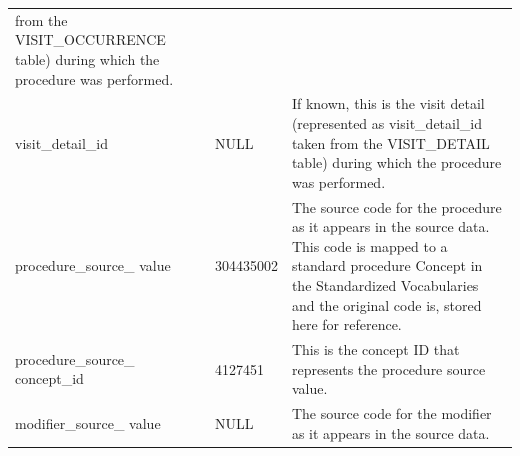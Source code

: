 \documentclass[11pt]{book}
\begin{document}
\begin{longtable}[]{@{}lll@{}}
\begin{minipage}[t]{0.48\columnwidth}
from the VISIT\_OCCURRENCE table) during which the procedure was
performed.\strut
\end{minipage}\tabularnewline
\begin{minipage}[t]{0.28\columnwidth}\raggedright\strut
visit\_detail\_id\strut
\end{minipage} & \begin{minipage}[t]{0.16\columnwidth}\raggedright\strut
NULL\strut
\end{minipage} & \begin{minipage}[t]{0.48\columnwidth}\raggedright\strut
If known, this is the visit detail (represented as visit\_detail\_id
taken from the VISIT\_DETAIL table) during which the procedure was
performed.\strut
\end{minipage}\tabularnewline
\begin{minipage}[t]{0.28\columnwidth}\raggedright\strut
procedure\_source\_ value\strut
\end{minipage} & \begin{minipage}[t]{0.16\columnwidth}\raggedright\strut
304435002\strut
\end{minipage} & \begin{minipage}[t]{0.48\columnwidth}\raggedright\strut
The source code for the procedure as it appears in the source data. This
code is mapped to a standard procedure Concept in the Standardized
Vocabularies and the original code is, stored here for reference.\strut
\end{minipage}\tabularnewline
\begin{minipage}[t]{0.28\columnwidth}\raggedright\strut
procedure\_source\_ concept\_id\strut
\end{minipage} & \begin{minipage}[t]{0.16\columnwidth}\raggedright\strut
4127451\strut
\end{minipage} & \begin{minipage}[t]{0.48\columnwidth}\raggedright\strut
This is the concept ID that represents the procedure source value.\strut
\end{minipage}\tabularnewline
\begin{minipage}[t]{0.28\columnwidth}\raggedright\strut
modifier\_source\_ value\strut
\end{minipage} & \begin{minipage}[t]{0.16\columnwidth}\raggedright\strut
NULL\strut
\end{minipage} & \begin{minipage}[t]{0.48\columnwidth}\raggedright\strut
The source code for the modifier as it appears in the source data.\strut
\end{minipage}\tabularnewline
\bottomrule
\end{longtable}
\end{document}
